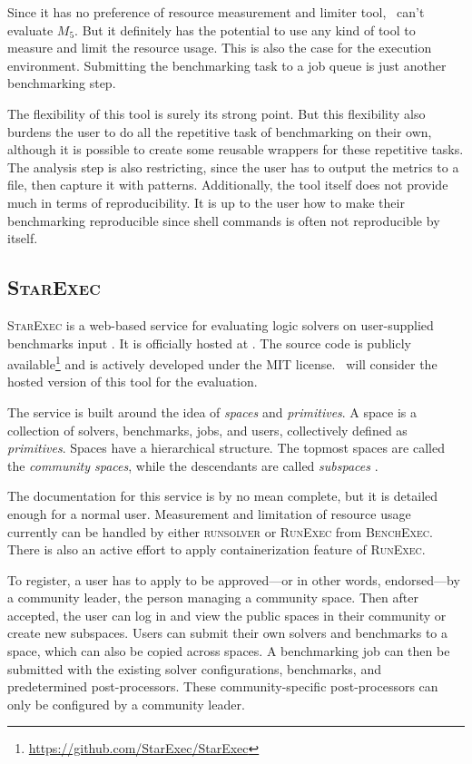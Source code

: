 Since it has no preference of resource measurement and limiter tool, \first~can't evaluate $M_5$.
But it definitely has the potential to use any kind of tool to measure and limit the resource usage.
This is also the case for the execution environment.
Submitting the benchmarking task to a job queue is just another benchmarking step.

The flexibility of this tool is surely its strong point.
But this flexibility also burdens the user to do all the repetitive task of benchmarking on their own, although it is possible to create some reusable wrappers for these repetitive tasks.
The analysis step is also restricting, since the user has to output the metrics to a file, then capture it with patterns.
Additionally, the tool itself does not provide much in terms of reproducibility.
It is up to the user how to make their benchmarking reproducible since shell commands is often not reproducible by itself.


\subsection{\textsc{StarExec}}

\textsc{StarExec} is a web-based service for evaluating logic solvers on user-supplied benchmarks input \citep{stumpStarExecCrossCommunityInfrastructure2014}.
It is officially hosted at \href{https://www.starexec.org/}{}.
The source code is publicly available\footnote{\href{https://github.com/StarExec/StarExec}{https://github.com/StarExec/StarExec}} and is actively developed under the MIT license.
\First~will consider the hosted version of this tool for the evaluation.

The service is built around the idea of \emph{spaces} and \emph{primitives}.
A space is a collection of solvers, benchmarks, jobs, and users, collectively defined as \emph{primitives}.
Spaces have a hierarchical structure.
The topmost spaces are called the \emph{community spaces}, while the descendants are called \emph{subspaces} \citep{stumpStarExecCrossCommunityInfrastructure2014}.

The documentation for this service is by no mean complete, but it is detailed enough for a normal user.
Measurement and limitation of resource usage currently can be handled by either \textsc{runsolver} or \textsc{RunExec} from \textsc{BenchExec}.
There is also an active effort to apply containerization feature of \textsc{RunExec}.

To register, a user has to apply to be approved---or in other words, endorsed---by a community leader, the person managing a community space.
Then after accepted, the user can log in and view the public spaces in their community or create new subspaces.
Users can submit their own solvers and benchmarks to a space, which can also be copied across spaces.
A benchmarking job can then be submitted with the existing solver configurations, benchmarks, and predetermined post-processors.
These community-specific post-processors can only be configured by a community leader.


